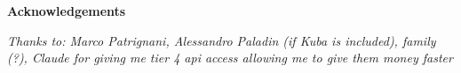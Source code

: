 \thispagestyle{empty}

\begin{center}
    {\bf \Huge Acknowledgements}
\end{center}

\vspace{4cm}

\emph{
    Thanks to:
    Marco Patrignani,
    Alessandro Paladin (if Kuba is included),
    family (?),
    Claude for giving me tier 4 api access allowing me to give them money faster
}

